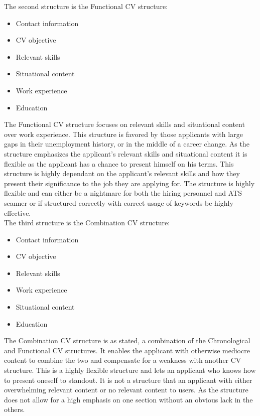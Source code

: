 The second structure is the Functional CV structure:
\begin{itemize}
   \item  Contact information
   \item  CV objective
   \item  Relevant skills
   \item  Situational content
   \item  Work experience
   \item  Education\\ 
   \end{itemize}
The Functional CV structure focuses on relevant skills and situational content over work experience.
This structure is favored by those applicants with large gaps in their unemployment history, or in the middle of a career change.
As the structure emphasizes the applicant's relevant skills and situational content it is flexible as the applicant has a chance to present himself on his terms.
This structure is highly dependant on the applicant's relevant skills and how they present their significance to the job they are applying for.
The structure is highly flexible and can either be a nightmare for both the hiring personnel and ATS scanner or if structured correctly with correct usage of keywords be highly effective.\\
    
The third structure is the Combination CV structure:
\begin{itemize}
   \item  Contact information
   \item  CV objective
   \item  Relevant skills
   \item  Work experience
   \item  Situational content
   \item  Education \\
   \end{itemize}
The Combination CV structure is as stated, a combination of the Chronological and Functional CV structures. 
It enables the applicant with otherwise mediocre content to combine the two and compensate for a weakness with another CV structure.
This is a highly flexible structure and lets an applicant who knows how to present oneself to standout.
It is not a structure that an applicant with either overwhelming relevant content or no relevant content to users.
   As the structure does not allow for a high emphasis on one section without an obvious lack in the others.
   \cite{Resume_structure}
   \cite{Tips_for_best_format}
   \cite{8_Best_cv_format}
\clearpage
